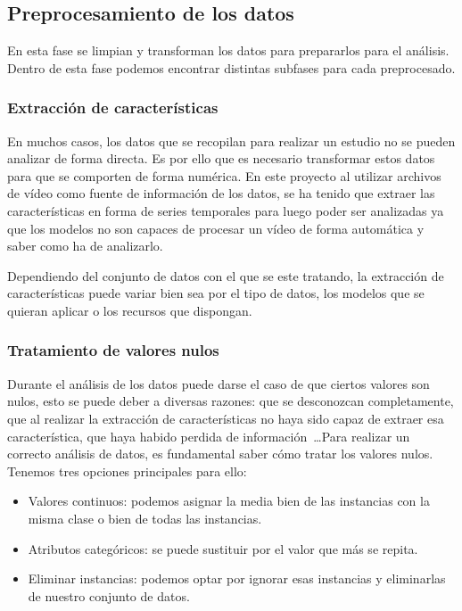 \subsection{Preprocesamiento de los datos}
En esta fase se limpian y transforman los datos para prepararlos para el análisis. Dentro de esta fase podemos encontrar distintas subfases para cada preprocesado.

\subsubsection{Extracción de características}
En muchos casos, los datos que se recopilan para realizar un estudio no se pueden analizar de forma directa. Es por ello que es necesario transformar estos datos para que se comporten de forma numérica. En este proyecto al utilizar archivos de vídeo como fuente de información de los datos, se ha tenido que extraer las características en forma de series temporales para luego poder ser analizadas ya que los modelos no son capaces de procesar un vídeo de forma automática y saber como ha de analizarlo.

Dependiendo del conjunto de datos con el que se este tratando, la extracción de características puede variar bien sea por el tipo de datos, los modelos que se quieran aplicar o los recursos que dispongan.

\subsubsection{Tratamiento de valores nulos}
Durante el análisis de los datos puede darse el caso de que ciertos valores son nulos, esto se puede deber a diversas razones: que se desconozcan completamente, que al realizar la extracción de características no haya sido capaz de extraer esa característica, que haya habido perdida de información~\ldots Para realizar un correcto análisis de datos, es fundamental saber cómo tratar los valores nulos. Tenemos tres opciones principales para ello:
\begin{itemize}
\item Valores continuos: podemos asignar la media bien de las instancias con la misma clase o bien de todas las instancias.
\item Atributos categóricos: se puede sustituir por el valor que más se repita.
\item Eliminar instancias: podemos optar por ignorar esas instancias y eliminarlas de nuestro conjunto de datos.
\end{itemize} 

